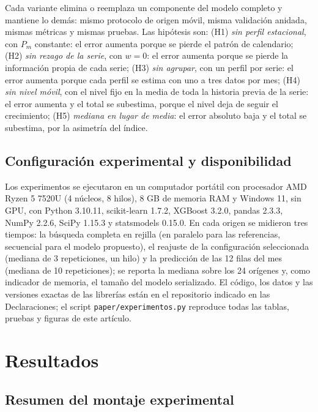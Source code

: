 \documentclass[pdflatex,sn-mathphys-num]{sn-jnl}
\begin{document}
Cada variante elimina o reemplaza un componente del modelo completo y mantiene lo demás: mismo protocolo de origen móvil, misma validación anidada, mismas métricas y mismas pruebas. Las hipótesis son: (H1) \emph{sin perfil estacional}, con $P_m$ constante: el error aumenta porque se pierde el patrón de calendario; (H2) \emph{sin rezago de la serie}, con $w=0$: el error aumenta porque se pierde la información propia de cada serie; (H3) \emph{sin agrupar}, con un perfil por serie: el error aumenta porque cada perfil se estima con uno a tres datos por mes; (H4) \emph{sin nivel móvil}, con el nivel fijo en la media de toda la historia previa de la serie: el error aumenta y el total se subestima, porque el nivel deja de seguir el crecimiento; (H5) \emph{mediana en lugar de media}: el error absoluto baja y el total se subestima, por la asimetría del índice.

\subsection{Configuración experimental y disponibilidad}\label{subsec:config}

Los experimentos se ejecutaron en un computador portátil con procesador AMD Ryzen 5 7520U (4 núcleos, 8 hilos), 8 GB de memoria RAM y Windows 11, sin GPU, con Python 3.10.11, scikit-learn 1.7.2, XGBoost 3.2.0, pandas 2.3.3, NumPy 2.2.6, SciPy 1.15.3 y statsmodels 0.15.0. En cada origen se midieron tres tiempos: la búsqueda completa en rejilla (en paralelo para las referencias, secuencial para el modelo propuesto), el reajuste de la configuración seleccionada (mediana de 3 repeticiones, un hilo) y la predicción de las 12 filas del mes (mediana de 10 repeticiones); se reporta la mediana sobre los 24 orígenes y, como indicador de memoria, el tamaño del modelo serializado. El código, los datos y las versiones exactas de las librerías están en el repositorio indicado en las Declaraciones; el script \texttt{paper/experimentos.py} reproduce todas las tablas, pruebas y figuras de este artículo.

\section{Resultados}\label{sec:resultados}

\subsection{Resumen del montaje experimental}\label{subsec:montaje}
\end{document}

